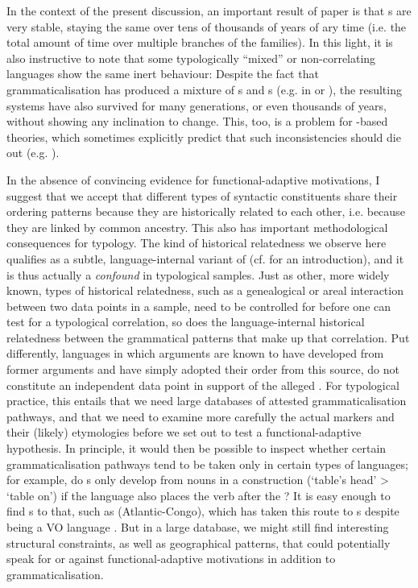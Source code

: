 \documentclass[output=paper]{langsci/langscibook}
\begin{document}
In the context of the present discussion, an important result of  paper is that s are very stable, staying the same over tens of thousands of years of ary time (i.e. the total amount of time over multiple branches of the families). In this light, it is also instructive to note that some typologically “mixed” or non-correlating languages show the same inert behaviour: Despite the fact that grammaticalisation has produced a mixture of s and s (e.g. in  or ), the resulting systems have also survived for many generations, or even thousands of years, without showing any inclination to change. This, too, is a problem for -based theories, which sometimes explicitly predict that such inconsistencies should die out (e.g. \citealt{KirbyHurford1997}).

In the absence of convincing evidence for functional-adaptive motivations, I suggest that we accept that different types of syntactic constituents share their ordering patterns because they are historically related to each other, i.e. because they are linked by common ancestry. This also has important methodological consequences for typology. The kind of historical relatedness we observe here \label{pg:collins:dependency}qualifies as a subtle, language-internal variant of  (cf. \citealt{Cysouw2011} for an introduction), and it is thus actually a \textit{confound} in typological samples. Just as other, more widely known, types of historical relatedness, such as a genealogical or areal interaction between two data points in a sample, need to be controlled for before one can test for a typological correlation, so does the language-internal historical relatedness between the grammatical patterns that make up that correlation. Put differently, languages in which  arguments are known to have developed from former  arguments and have simply adopted their order from this source, do not constitute an independent data point in support of the alleged . For typological practice, this entails that we need large databases
\label{pg:collins:refforhaspelmath}of attested grammaticalisation pathways, and that we need to examine more carefully the actual markers and their (likely) etymologies before we set out to test a functional-adaptive hypothesis. In principle, it would then be possible to inspect whether certain grammaticalisation pathways tend to be taken only in certain types of languages; for example, do s only develop from nouns in a  construction (‘table's head’ > ‘table on’) if the language also places the verb after the ? It is easy enough to find s to that, such as  (Atlantic-Congo), which has taken this route to s despite being a VO language \citep{Bodomo1997}. But in a large database, we might still find interesting structural constraints, as well as geographical patterns, that could potentially speak for or against functional-adaptive motivations in addition to grammaticalisation. 
\end{document}

